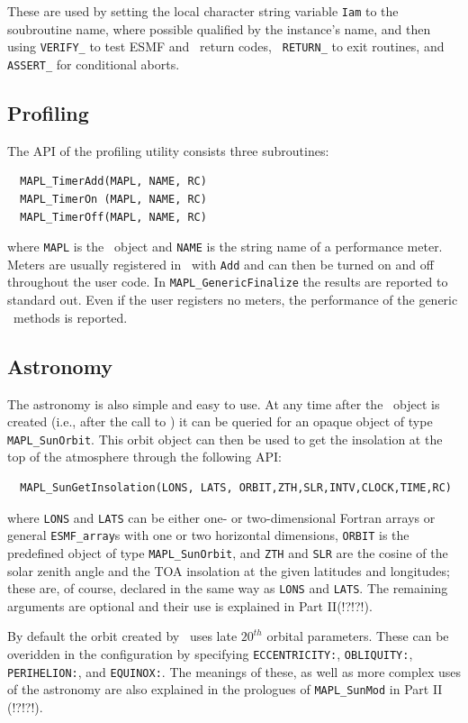 These are used by setting the local character string variable {\tt Iam} to
the soubroutine name, where possible qualified by the instance's name,
and then using {\tt VERIFY\_} to test ESMF and \ggn\  return codes, {\tt
RETURN\_} to exit routines, and {\tt ASSERT\_} for conditional aborts. 

\subsection{Profiling}
The API of the profiling utility consists three subroutines:
\begin{verbatim}
  MAPL_TimerAdd(MAPL, NAME, RC)
  MAPL_TimerOn (MAPL, NAME, RC)
  MAPL_TimerOff(MAPL, NAME, RC)
\end{verbatim}
where {\tt MAPL} is the \ggn\  object and {\tt NAME} is the string
name of a performance meter. Meters are usually registered in \ssv\
with {\tt Add} and can then be turned on and off throughout the user
code. In \texttt{MAPL\_GenericFinalize} the results are reported to standard
out. Even if the user registers no meters, the performance of the
generic \IRF\ methods is reported.

\subsection{Astronomy}

The astronomy is also simple and easy to use. At any time after the
\ggn\ object is created (i.e., after the call to \gssv) it can be
queried for an opaque object of type {\tt MAPL\_SunOrbit}.
This orbit object can
then be used to get the insolation at the top of the atmosphere
through the following API:

\begin{verbatim}
  MAPL_SunGetInsolation(LONS, LATS, ORBIT,ZTH,SLR,INTV,CLOCK,TIME,RC)
\end{verbatim}

where {\tt LONS} and {\tt LATS} can be either one- or two-dimensional
Fortran arrays or general \texttt{ESMF\_array}s with one or two horizontal
dimensions, {\tt ORBIT} is the predefined object of type
{\tt MAPL\_SunOrbit}, and {\tt ZTH} and {\tt SLR} are the cosine of the
solar zenith angle
and the TOA insolation at the given latitudes and longitudes; these are,
of course, declared in the same way as  {\tt LONS} and {\tt LATS}. The
remaining arguments are optional and their use is explained in Part II(!?!?!).

By default the orbit created by \ggn\  uses late $20^{th}$
orbital parameters. These can be
overidden in the configuration by specifying {\tt ECCENTRICITY:},
{\tt OBLIQUITY:}, {\tt PERIHELION:}, and {\tt EQUINOX:}. The meanings
of these, as well as more complex uses of the astronomy are also explained
in the prologues of {\tt MAPL\_SunMod} in Part II (!?!?!).

